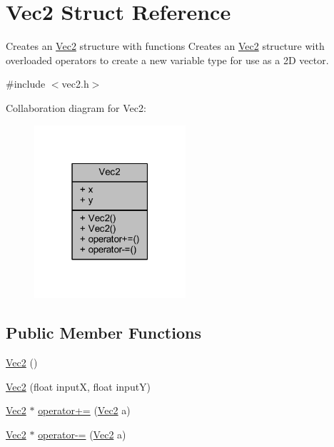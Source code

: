 \hypertarget{struct_vec2}{\section{Vec2 Struct Reference}
\label{struct_vec2}
}


Creates an \hyperlink{struct_vec2}{Vec2} structure with functions Creates an \hyperlink{struct_vec2}{Vec2} structure with overloaded operators to create a new variable type for use as a 2\+D vector.  




{\ttfamily \#include $<$vec2.\+h$>$}



Collaboration diagram for Vec2\+:
\nopagebreak
\begin{figure}[H]
\begin{center}
\leavevmode
\includegraphics[width=159pt]{struct_vec2__coll__graph}
\end{center}
\end{figure}
\subsection*{Public Member Functions}
\begin{DoxyCompactItemize}
\item 
\hyperlink{struct_vec2_a76080feed7005893ecc634f903cfbae0}{Vec2} ()
\item 
\hyperlink{struct_vec2_a08e2e10202361659c3b7d003ee84ebec}{Vec2} (float input\+X, float input\+Y)
\item 
\hyperlink{struct_vec2}{Vec2} $\ast$ \hyperlink{struct_vec2_a00055ba3b91ef5faeaeb12a4289572f6}{operator+=} (\hyperlink{struct_vec2}{Vec2} a)
\item 
\hyperlink{struct_vec2}{Vec2} $\ast$ \hyperlink{struct_vec2_a6171d807b945b23574c33d6ddf1af74a}{operator-\/=} (\hyperlink{struct_vec2}{Vec2} a)
\end{DoxyCompactItemize}
